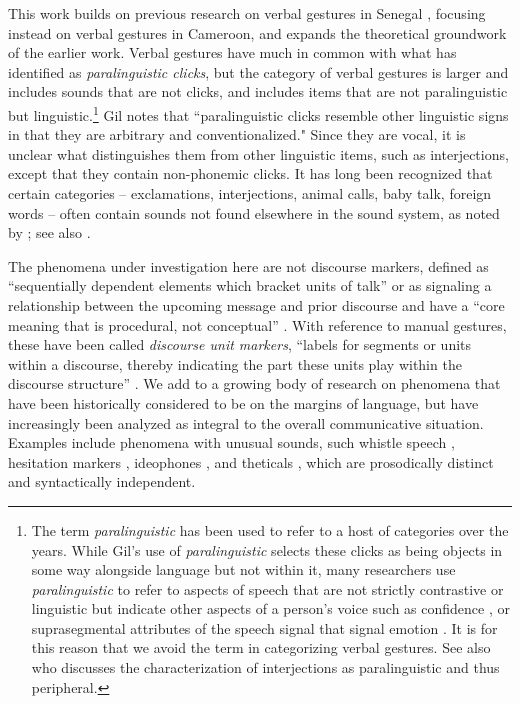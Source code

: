 \documentclass[output=paper,newtxmath,modfonts,nonflat,hidelinks]{langsci/langscibook}
\begin{document}
This work builds on previous research on verbal gestures in Senegal \citet{grenobleetal2015}, focusing instead on verbal gestures in Cameroon, and expands the theoretical groundwork of the earlier work. Verbal gestures have much in common with what \citep{wals-142} has identified as \textit{paralinguistic clicks}, but the category of verbal gestures is larger and includes sounds that are not clicks, and includes items that are not paralinguistic but linguistic.\footnote{The term \textit{paralinguistic} has been used to refer to a host of categories over the years. While Gil’s use of \textit{paralinguistic} selects these clicks as being objects in some way alongside language but not within it, many researchers use \textit{paralinguistic} to refer to aspects of speech that are not strictly contrastive or linguistic but indicate other aspects of a person’s voice such as confidence \citep{Scherer197331}, or suprasegmental attributes of the speech signal that signal emotion \citep{Fujisaki1993}. It is for this reason that we avoid the term in categorizing verbal gestures.  See also \citet[112]{ameka1992} who discusses the characterization of interjections as paralinguistic and thus peripheral.} Gil notes that ``paralinguistic clicks resemble other linguistic signs in that they are arbitrary and conventionalized." Since they are vocal, it is unclear what distinguishes them from other linguistic items, such as interjections, except that they contain non-phonemic clicks. It has long been recognized that certain categories -- exclamations, interjections, animal calls, baby talk, foreign words -- often contain sounds not found elsewhere in the sound system, as noted by \citep[71]{harris1951}; see also \citep{friespike}.

The phenomena under investigation here are not discourse markers, defined as
 ``sequentially dependent elements which bracket units of talk'' \citep[31]{schiffrin1987}  or as signaling  a relationship between the upcoming message and prior discourse \citep{fraser1990, fraser1996, fraser1999} and have a ``core meaning that is procedural, not conceptual'' \citep[950]{fraser1999}. With reference to manual gestures, these have been called \textit{discourse unit markers}, ``labels for segments or units within a discourse, thereby indicating the part these units play within the discourse structure'' \citep[248]{kendon1995}. We add to a growing body of research on phenomena that have been historically considered to be on the margins of language, but have increasingly been analyzed as integral to the overall communicative situation. Examples include phenomena with unusual sounds, such whistle speech \citep{meyer2015, sicoli2016}, hesitation markers \citep{dingemanse2013plos, schegloff1982}, ideophones \citep{childs1994}, and theticals \citep{kaltenbocketal2011}, which are prosodically distinct and syntactically independent.
 
\end{document}
